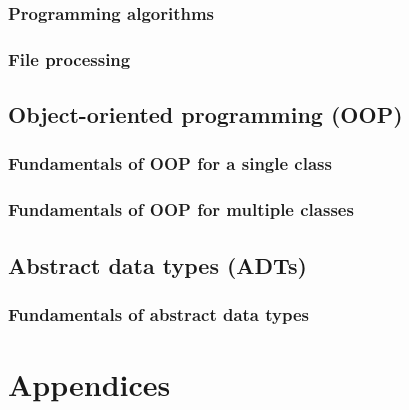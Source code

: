 \documentclass[a4paper,12pt]{article}
\begin{document}
\subsubsection{Programming algorithms}
\subsubsection{File processing}
\subsection{Object-oriented programming (OOP)}
\subsubsection{Fundamentals of OOP for a single class}
\subsubsection{Fundamentals of OOP for multiple classes}
\subsection{Abstract data types (ADTs)}
\subsubsection{Fundamentals of abstract data types}
\newpage
\section{Appendices}
\end{document}
